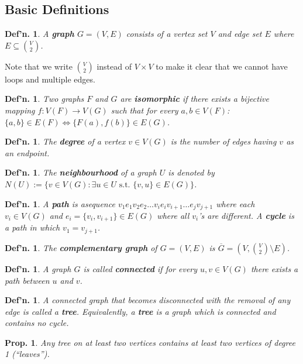 \documentclass[12pt, a4paper]{book}
\newtheorem{definition}[theorem]{Def'n.}
\newtheorem{proposition}[theorem]{Prop.}
\theoremstyle{nonumberplain}
\begin{document}
\subsection{Basic Definitions}
\begin{definition}
    A \textbf{graph} $G=(V,E)$ consists of a vertex set $V$ and edge set $E$ where $E\subseteq\binom{V}{2}$.
\end{definition}
Note that we write $\binom{V}{2}$ instead of $V\times V$ to make it clear that we cannot have loops and multiple edges.
\begin{definition}
    Two graphs $F$ and $G$ are \textbf{isomorphic} if there exists a bijective mapping $f:V(F)\to V(G)$ such that for every $a,b\in V(F)$: $\{a,b\}\in E(F)\Leftrightarrow \{F(a),f(b)\}\in E(G)$.
\end{definition}
\begin{definition}
    The \textbf{degree} of a vertex $v\in V(G)$ is the number of edges having $v$ as an endpoint.
\end{definition}
\begin{definition}
    The \textbf{neighbourhood} of a graph $U$ is denoted by $N(U):=\{v\in V(G):\exists u\in U\text{ s.t. }\{v,u\}\in E(G)\}$.
\end{definition}
\begin{definition}
    A \textbf{path} is asequence $v_1e_1v_2e_2\ldots v_ie_iv_{i+1}\ldots e_jv_{j+1}$ where each $v_i\in V(G)$ and $e_i=\{v_i,v_{i+1}\}\in E(G)$ where all $v_i$'s are different.
    A \textbf{cycle} is a path in which $v_1=v_{j+1}$.
\end{definition}
\begin{definition}
    The \textbf{complementary graph} of $G=(V,E)$ is $\overline{G}=\left(V,\binom{V}{2}\setminus E\right)$.
\end{definition}
\begin{definition}
    A graph $G$ is called \textbf{connected} if for every $u,v\in V(G)$ there exists a path between $u$ and $v$.
\end{definition}
\begin{definition}
    A connected graph that becomes disconnected with the removal of any edge is called a \textbf{tree}.
    Equivalently, a \textbf{tree} is a graph which is connected and contains no cycle.
\end{definition}
\begin{proposition}
    Any tree on at least two vertices contains at least two vertices of degree 1 (``leaves'').
\end{proposition}
\end{document}
